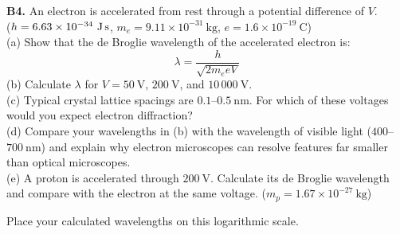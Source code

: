 \begin{exercisebox}[27]
\vspace{0.4cm}

\textbf{B4.} An electron is accelerated from rest
through a potential difference of $V$.\\
($h = 6.63\times10^{-34}\ \text{J\,s}$,
$m_e = 9.11\times10^{-31}\ \text{kg}$,
$e = 1.6\times10^{-19}\ \text{C}$)\\[4pt]
(a) Show that the de Broglie wavelength of the
accelerated electron is:
\[
  \lambda = \frac{h}{\sqrt{2m_e eV}}
\]
(b) Calculate $\lambda$ for $V = 50\ \text{V}$,
$200\ \text{V}$, and $10\,000\ \text{V}$.\\
(c) Typical crystal lattice spacings are
$0.1$--$0.5\ \text{nm}$. For which of these voltages
would you expect electron diffraction?\\
(d) Compare your wavelengths in (b) with the
wavelength of visible light ($400$--$700\ \text{nm}$)
and explain why electron microscopes can resolve
features far smaller than optical microscopes.\\
(e) A proton is accelerated through $200\ \text{V}$.
Calculate its de Broglie wavelength and compare
with the electron at the same voltage.
($m_p = 1.67\times10^{-27}\ \text{kg}$)
\hfill{}

\begin{center}
\par\smallskip\footnotesize Place your calculated wavelengths on this logarithmic scale.
\end{center}


\end{exercisebox}

